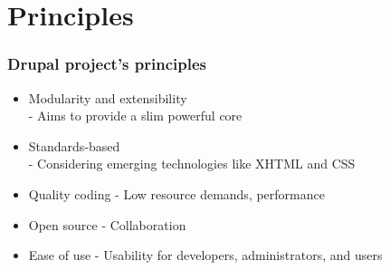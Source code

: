 \section{Principles}

\begin{frame}[allowframebreaks]
\frametitle{Drupal project's principles}

\begin{itemize}
	\item Modularity and extensibility \\
	- Aims to provide a slim powerful core
	\item Standards-based \\
	- Considering emerging technologies like XHTML and CSS
	\item Quality coding \linebreak
	- Low resource demands, performance
	\item Open source \linebreak
	- Collaboration
	\item Ease of use \linebreak
	- Usability for developers, administrators, and users
\end{itemize}

\end{frame}